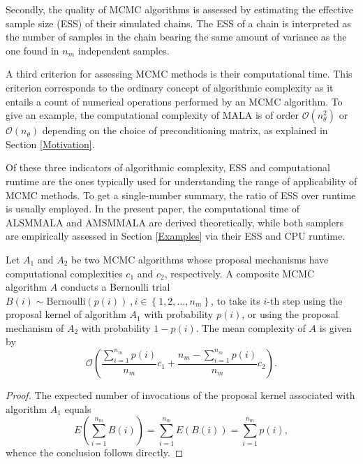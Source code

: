\documentclass[twoside,11pt]{article}
\begin{document}
Secondly, the quality of MCMC algorithms is assessed by estimating the effective sample size (ESS) of their simulated chains.
The ESS of a chain is interpreted as the number of samples in the chain bearing the same amount of variance as the one found 
in $n_m$ independent samples.

A third criterion for assessing MCMC methods is their computational time.
This criterion corresponds to the ordinary concept of algorithmic complexity as it entails a count of numerical operations
performed by an MCMC algorithm. To give an example, the computational complexity of MALA is of order
$\mathcal{O}(n_{\theta}^2)$ or $\mathcal{O}(n_{\theta})$ depending on the choice of preconditioning matrix, as explained in 
Section \ref{Motivation}.

Of these three indicators of algorithmic complexity, ESS and computational runtime are the ones typically used for
understanding the range of applicability of MCMC methods. To get a single-number summary, the ratio of ESS over runtime is
usually employed. In the present paper, the computational time of ALSMMALA and AMSMMALA are derived theoretically, while both
samplers are empirically assessed in Section \ref{Examples} via their ESS and CPU runtime.

\begin{proposition}
Let $A_1$ and $A_2$ be two MCMC algorithms whose proposal mechanisms have computational complexities $c_1$ and $c_2$, 
respectively. A composite MCMC algorithm $A$ conducts a Bernoulli trial
$B(i)\sim\mbox{Bernoulli}(p(i))~,i\in\left\{1,2,\dots,n_m\right\}$, to take its $i$-th step using the proposal kernel of 
algorithm $A_1$ with probability $p(i)$, or using the proposal mechanism of $A_2$ with probability $1-p(i)$. The mean 
complexity of $A$ is given by
\begin{equation}
\label{eq:c}
\mathcal{O}\left(
\dfrac{\sum_{i=1}^{n_m}p(i)}{n_m}c_1+\dfrac{n_m-\sum_{i=1}^{n_m}p(i)}{n_m}c_2
\right).
\end{equation}
\end{proposition}

\begin{proof}
The expected number of invocations of the proposal kernel associated with algorithm $A_1$ equals 
\begin{equation*}
E\left(\sum_{i=1}^{n_m}B(i)\right)=\sum_{i=1}^{n_m}E(B(i))=\sum_{i=1}^{n_m}p(i),
\end{equation*}
whence the conclusion follows directly.
\end{proof}
\end{document}
